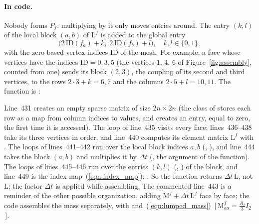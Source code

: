 \paragraph{In code.} Nobody forms $P_f$: multiplying by it only moves entries around. The entry $(k, l)$ of the local block $(a, b)$ of $\mathrm L^f$ is added to the global entry
\begin{equation}
\label{eqn:index_map}
\big( 2\, \mathrm{ID}(f_a) + k,\; 2\, \mathrm{ID}(f_b) + l \big), \quad k, l \in \{0, 1\},
\end{equation}
with the zero-based vertex indices $\mathrm{ID}$ of the mesh. For example, a face whose vertices have the indices $\mathrm{ID} = 0, 3, 5$ (the vertices $1$, $4$, $6$ of Figure~\ref{fig:assembly}, counted from one) sends its block $(2, 3)$, the coupling of its second and third vertices, to the rows $2\cdot 3 + k = 6, 7$ and the columns $2\cdot 5 + l = 10, 11$. The function is :

Line~431 creates an empty sparse matrix of size $2n\times 2n$ (the class  of  stores each row as a map from column indices to values, and creates an entry, equal to zero, the first time it is accessed). The loop of line~435 visits every face; lines~436--438 take its three vertices in order, and line~440 computes its element matrix $\mathrm L^f$ with . The loops of lines~441--442 run over the local block indices $a, b$ (, ), and line~444 takes the block $(a, b)$ and multiplies it by $\Delta t$ (, the argument of the function). The loops of lines~445--446 run over the entries $(k, l)$ (, ) of the block, and line~449 is the index map~(\ref{eqn:index_map}): . So the function returns $\Delta t\, \mathrm L$, not $\mathrm L$; the factor $\Delta t$ is applied while assembling. The commented line~443 is a reminder of the other possible organization, adding $\mathrm M^f + \Delta t\, \mathrm L^f$ face by face; the code assembles the mass separately, with  and~(\ref{eqn:lumped_mass})~[\,$\mathrm M^f_{aa} = \tfrac{A_f}3 I_2$\,].

